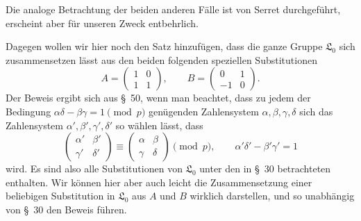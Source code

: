 \documentclass[11pt]{article}
\newcommand{\Lzero}{\mathfrak L_0}
\begin{document}
Die analoge Betrachtung der beiden anderen Fälle ist von Serret durchgeführt, erscheint aber für unseren Zweck entbehrlich.

Dagegen wollen wir hier noch den Satz hinzufügen, dass die ganze Gruppe $\Lzero$ sich zusammensetzen lässt aus den beiden folgenden speziellen Substitutionen
\begin{equation}
 A=\begin{pmatrix}1&0\\1&1\end{pmatrix},
 \qquad
 B=\begin{pmatrix}0&1\\-1&0\end{pmatrix}.
\tag{10}
\end{equation}
Der Beweis ergibt sich aus \S~50, wenn man beachtet, dass zu jedem der Bedingung $\alpha\delta-\beta\gamma=1\pmod p$ genügenden Zahlensystem $\alpha,\beta,\gamma,\delta$ sich das Zahlensystem $\alpha',\beta',\gamma',\delta'$ so wählen lässt, dass
\[
 \begin{pmatrix}\alpha'&\beta'\\\gamma'&\delta'\end{pmatrix}
 \equiv
 \begin{pmatrix}\alpha&\beta\\\gamma&\delta\end{pmatrix}
 \pmod p,
 \qquad
 \alpha'\delta'-\beta'\gamma'=1
\]
wird. Es sind also alle Substitutionen von $\Lzero$ unter den in \S~30 betrachteten enthalten. Wir können hier aber auch leicht die Zusammensetzung einer beliebigen Substitution in $\Lzero$ aus $A$ und $B$ wirklich darstellen, und so unabhängig von \S~30 den Beweis führen.
\end{document}
